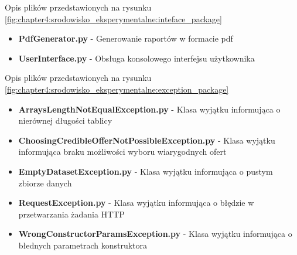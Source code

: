 \documentclass[../Kamil_Kowalewski_Main.tex]{subfiles}
\begin{document}
{{{            Opis plików przedstawionych na rysunku
            \ref{fig:chapter4:srodowisko_eksperymentalne:inteface_package}
            \begin{itemize}[noitemsep,topsep=1pt]
                \item \textbf{PdfGenerator.py} - Generowanie raportów w formacie pdf
                \item \textbf{UserInterface.py} - Obsługa konsolowego interfejsu użytkownika
            \end{itemize}

            Opis plików przedstawionych na rysunku
            \ref{fig:chapter4:srodowisko_eksperymentalne:exception_package}
            \begin{itemize}[noitemsep,topsep=1pt]
                \item \textbf{ArraysLengthNotEqualException.py} - Klasa wyjątku informująca o nierównej długości tablicy
                \item \textbf{ChoosingCredibleOfferNotPossibleException.py} - Klasa wyjątku informująca braku możliwości wyboru wiarygodnych ofert
                \item \textbf{EmptyDatasetException.py} - Klasa wyjątku informująca o pustym zbiorze danych
                \item \textbf{RequestException.py} - Klasa wyjątku informująca o błędzie w przetwarzania żadania HTTP
                \item \textbf{WrongConstructorParamsException.py} - Klasa wyjątku informująca o błednych parametrach konstruktora
            \end{itemize}

}}}
\end{document}
